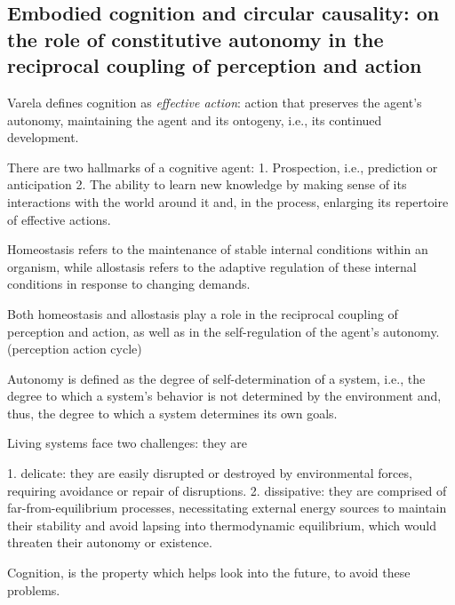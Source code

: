 \subsection{Embodied cognition and circular causality: on the role of constitutive autonomy in the reciprocal coupling of perception and action}

\cite{vernon_embodied_2015}
Varela defines cognition as \textit{effective action}: action that preserves the agent's autonomy, maintaining the agent and its ontogeny, i.e., its continued development.

There are two hallmarks of a cognitive agent:
1. Prospection, i.e., prediction or anticipation
2. The ability to learn new knowledge by making sense of its interactions with the world around it and, in the process, enlarging its repertoire of effective actions.

Homeostasis refers to the maintenance of stable internal conditions within an organism, while allostasis refers to the adaptive regulation of these internal conditions in response to changing demands.

Both homeostasis and allostasis play a role in the reciprocal coupling of perception and action, as well as in the self-regulation of the agent's autonomy. (\gls{perception action cycle})

Autonomy is defined as the degree of self-determination of a system, i.e., the degree to which a system's behavior is not determined by the environment and, thus, the degree to which a system determines its own goals. 


Living systems face two challenges: they are 

1. delicate: they are easily disrupted or destroyed by environmental forces, requiring avoidance or repair of disruptions.
2. dissipative: they are comprised of far-from-equilibrium processes, necessitating external energy sources to maintain their stability and avoid lapsing into thermodynamic equilibrium, which would threaten their autonomy or existence.


Cognition, is the property which helps look into the future, to avoid these problems.

